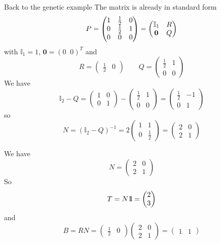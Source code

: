 \documentclass[aspectratio=169]{beamer}\usepackage[]{graphicx}\usepackage[]{xcolor}
\begin{document}
\begin{frame}{Back to the genetic example}
The matrix is already in standard form
\[
P=
\begin{pmatrix}
1 & \frac 12 & 0 \\
0 & \frac 12 & 1 \\
0 & 0 & 0
\end{pmatrix}
=\begin{pmatrix}
\mathbb{I}_1 & R \\
\b0 & Q
\end{pmatrix}
\]
with $\mathbb{I}_1=1$, $\mathbf{0}=(0\;\; 0)^T$ and
\[
R=\begin{pmatrix}
\frac 12 & 0
\end{pmatrix}
\qquad
Q=\begin{pmatrix}
\frac 12 & 1\\
0 & 0
\end{pmatrix}
\]
We have
\[
\mathbb{I}_2-Q=\begin{pmatrix}
1 & 0 \\
0 & 1
\end{pmatrix}
-\begin{pmatrix}
\frac 12 & 1\\
0 & 0
\end{pmatrix}
=\begin{pmatrix}
\frac 12 & -1\\
0 & 1
\end{pmatrix}
\]
so
\[
N=(\mathbb{I}_2-Q)^{-1}=
2\begin{pmatrix}
1 & 1 \\
0 & \frac 12
\end{pmatrix}=
\begin{pmatrix}
2 & 0 \\
2 & 1
\end{pmatrix}
\]
\end{frame}


\begin{frame}
We have
\[
N=
\begin{pmatrix}
	2 & 0 \\
	2 & 1
\end{pmatrix}
\]
So
\[
T=N\nbOne=\begin{pmatrix}
2\\
3
\end{pmatrix}
\]
and
\[
B=RN=
\begin{pmatrix}
	\frac 12 & 0
\end{pmatrix}
\begin{pmatrix}
	2 & 0 \\
	2 & 1
\end{pmatrix}
=
\begin{pmatrix}
1 & 1
\end{pmatrix}
\]
\end{frame}
\end{document}
